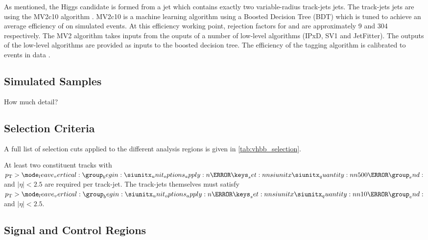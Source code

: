 %

%

As mentioned, the Higgs candidate is formed from a \largeR jet which contains exactly two \btagged variable-radius track-jets jets.
The track-jets jets are \btagged using the MV2c10 \btagging algorithm \cite{ATL-PHYS-PUB-2015-022,FTAG-2018-01,ATL-PHYS-PUB-2017-013}.
MV2c10 is a machine learning algorithm using a Boosted Decision Tree (BDT) which is tuned to achieve an average \bjet efficiency of  on simulated \ttbar events.
At this efficiency working point, rejection factors for \cjets and \ljets are approximately 9 and 304 respectively.
The MV2 algorithm takes inputs from the ouputs of a number of low-level algorithms (IPxD, SV1 and JetFitter).
The outputs of the low-level algorithms are provided as inputs to the boosted decision tree.
The efficiency of the tagging algorithm is calibrated to events in data \cite{PERF-2016-05,ATLAS-CONF-2018-006,ATLAS-CONF-2018-001}.


\subsection{Simulated Samples}

How much detail?
%


\subsection{Selection Criteria}\label{sec:vhbb_selections}

A full list of selection cuts applied to the different analysis regions is given in \cref{tab:vhbb_selection}.


At least two constituent tracks with $\pt > \SI{500}{\MeV}$ and $|\eta| < 2.5$ are required per track-jet.
The track-jets themselves must satisfy $\pt > \SI{10}{\GeV}$ and $|\eta| < 2.5$.

%

%

\subsection{Signal and Control Regions}\label{sec:vhbb_control_region}



